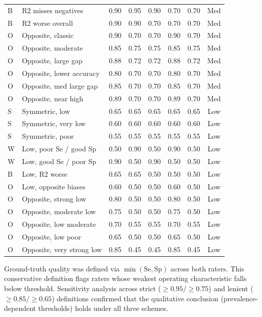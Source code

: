 \documentclass[11pt]{article}
\begin{document}
\begin{table}[h!]
\begin{tabular}{llcccccc}
B & R2 misses negatives        & 0.90 & 0.95 & 0.90 & 0.70 & 0.70 & Med \\
B & R2 worse overall           & 0.90 & 0.90 & 0.70 & 0.70 & 0.70 & Med \\
O & Opposite, classic          & 0.90 & 0.70 & 0.70 & 0.90 & 0.70 & Med \\
O & Opposite, moderate          & 0.85 & 0.75 & 0.75 & 0.85 & 0.75 & Med \\
O & Opposite, large gap        & 0.88 & 0.72 & 0.72 & 0.88 & 0.72 & Med \\
O & Opposite, lower accuracy   & 0.80 & 0.70 & 0.70 & 0.80 & 0.70 & Med \\
O & Opposite, med large gap    & 0.85 & 0.70 & 0.70 & 0.85 & 0.70 & Med \\
O & Opposite, near high        & 0.89 & 0.70 & 0.70 & 0.89 & 0.70 & Med \\
\midrule
S & Symmetric, low             & 0.65 & 0.65 & 0.65 & 0.65 & 0.65 & Low \\
S & Symmetric, very low        & 0.60 & 0.60 & 0.60 & 0.60 & 0.60 & Low \\
S & Symmetric, poor            & 0.55 & 0.55 & 0.55 & 0.55 & 0.55 & Low \\
W & Low, poor Se / good Sp     & 0.50 & 0.90 & 0.50 & 0.90 & 0.50 & Low \\
W & Low, good Se / poor Sp     & 0.90 & 0.50 & 0.90 & 0.50 & 0.50 & Low \\
B & Low, R2 worse              & 0.65 & 0.65 & 0.50 & 0.50 & 0.50 & Low \\
O & Low, opposite biases       & 0.60 & 0.50 & 0.50 & 0.60 & 0.50 & Low \\
O & Opposite, strong low       & 0.80 & 0.50 & 0.50 & 0.80 & 0.50 & Low \\
O & Opposite, moderate low     & 0.75 & 0.50 & 0.50 & 0.75 & 0.50 & Low \\
O & Opposite, low moderate     & 0.70 & 0.55 & 0.55 & 0.70 & 0.55 & Low \\
O & Opposite, low poor         & 0.65 & 0.50 & 0.50 & 0.65 & 0.50 & Low \\
O & Opposite, very strong low  & 0.85 & 0.45 & 0.45 & 0.85 & 0.45 & Low \\
\bottomrule
\end{tabular}
\end{table}

Ground-truth quality was defined via $\min(\text{Se}, \text{Sp})$ across both raters. This conservative definition flags raters whose weakest operating characteristic falls below threshold. Sensitivity analysis across strict ($\geq 0.95 / \geq 0.75$) and lenient ($\geq 0.85 / \geq 0.65$) definitions confirmed that the qualitative conclusion (prevalence-dependent thresholds) holds under all three schemes.
\end{document}
